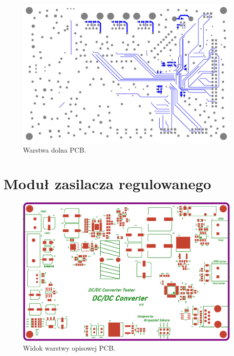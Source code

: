 \begin{figure}
    \begin{center}
        \includegraphics[width = 15cm]{zalaczniki/kontroler/Kontroler_Strona_14.jpg}
        \caption{Warstwa dolna PCB.}
    \end{center}
\end{figure}



\nopagebreak

\chapter{Moduł zasilacza regulowanego}


\begin{figure}[h!]
    \begin{center}
        \includegraphics[width = 17cm]{zalaczniki/zasilacz/Zasilacz_regulowany_Strona_13.jpg}
        \caption{Widok warstwy opisowej PCB.}
    \end{center}
\end{figure}

